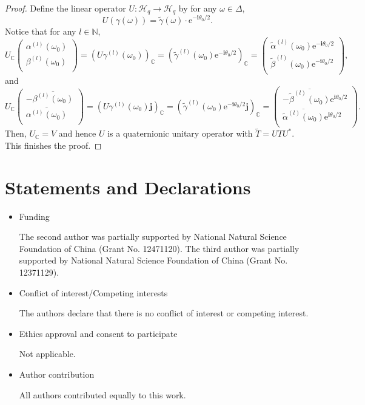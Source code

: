 \documentclass[pdflatex,sn-mathphys-num]{sn-jnl}%
\theoremstyle{thmstyleone}%
\theoremstyle{thmstyletwo}%
\theoremstyle{thmstylethree}%
\theoremstyle{definition}
\theoremstyle{remark}
\begin{document}
\begin{proof}
Define the linear operator $U:\mathcal{H}_q\rightarrow\mathcal{H}_q$ by for any $\omega\in\Delta$,
\[
U(\gamma(\omega))=\widetilde{\gamma}(\omega)\cdot \mathrm{e}^{-\boldsymbol{i}\theta_0/2}.
\]
Notice that for any $l\in\mathbb{N}$,
\[
U_{\mathbb{C}}
\begin{pmatrix}
	\alpha^{(l)}(\omega_0) \\
	\beta^{(l)}(\omega_0) \\
\end{pmatrix}
=(U\gamma^{(l)}(\omega_0))_{\mathbb{C}}=(\widetilde{\gamma}^{(l)}(\omega_0)\mathrm{e}^{-\boldsymbol{i}\theta_0/2})_{\mathbb{C}}=\begin{pmatrix}
	\widetilde{\alpha}^{(l)}(\omega_0)\mathrm{e}^{-\boldsymbol{i}\theta_0/2} \\
	\widetilde{\beta}^{(l)}(\omega_0)\mathrm{e}^{-\boldsymbol{i}\theta_0/2} \\
\end{pmatrix},
\]
and
\[
U_{\mathbb{C}}
\begin{pmatrix}
	-\overline{\beta^{(l)}(\omega_0)} \\
	\overline{\alpha^{(l)}(\omega_0)} \\
\end{pmatrix}
=(U\gamma^{(l)}(\omega_0)\boldsymbol{j})_{\mathbb{C}}=(\widetilde{\gamma}^{(l)}(\omega_0)\mathrm{e}^{-\boldsymbol{i}\theta_0/2}\boldsymbol{j})_{\mathbb{C}}=\begin{pmatrix}
	-\overline{\widetilde{\beta}^{(l)}(\omega_0)}\mathrm{e}^{\boldsymbol{i}\theta_0/2} \\
	\overline{\widetilde{\alpha}^{(l)}(\omega_0)}\mathrm{e}^{\boldsymbol{i}\theta_0/2} \\
\end{pmatrix}.
\]
Then, $U_{\mathbb{C}}=V$ and hence $U$ is a quaternionic unitary operator with $\widetilde{T}=UTU^*$. This finishes the proof.
\end{proof}


\section*{Statements and Declarations}

\begin{itemize}
	\item Funding 
	
	The second author was partially supported by National Natural Science Foundation of China (Grant No. 12471120). The third author was partially supported by National Natural Science Foundation of China (Grant No. 12371129).
	\item Conflict of interest/Competing interests 
	
	The authors declare that there is no conflict of interest or competing interest.
	\item Ethics approval and consent to participate
	
	Not applicable.
	\item Author contribution 
	
	All authors contributed equally to this work.
\end{itemize}
\end{document}
